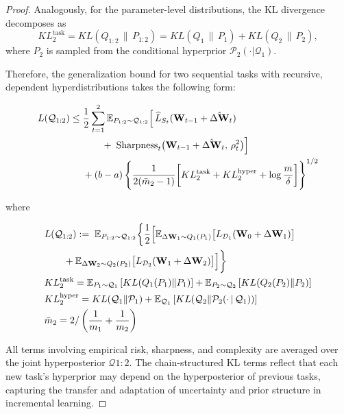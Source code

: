 \documentclass[letterpaper]{article} %
\begin{document}
\begin{proof}
Analogously, for the parameter-level distributions, the KL divergence decomposes as
\begin{equation}
    KL^{\text{task}}_2=KL(Q_{1:2}\,\|\,P_{1:2}) = KL(Q_1\,\|\,P_1) + KL(Q_2\,\|\,P_2),
\end{equation}
where $P_2$ is sampled from the conditional hyperprior $\mathcal{P}_2(\cdot|\mathcal{Q}_1)$.



Therefore, the generalization bound for two sequential tasks with recursive, dependent hyperdistributions takes the following form:

\begin{align}
L(\mathcal{Q}_{1:2}) \leq\; & \frac{1}{2} \sum_{t=1}^2 
    \mathbb{E}_{P_{1:2} \sim \mathcal{Q}_{1:2}} 
    \Big[\, 
        \widehat{L}_{S_t}(\mathbf{W}_{t-1} + \hat{\Delta\mathbf{W}}_t)
    \notag \\
& \qquad 
    +\; \mathrm{Sharpness}_t\big(\mathbf{W}_{t-1} + \hat{\Delta\mathbf{W}}_t,\, \rho_t^2\big)
    \Big] \notag \\
& + (b-a)\, 
    \Bigg\{ \frac{1}{2(\bar{m}_2 - 1)} \bigg[
        KL^{\text{task}}_2 + KL^{\text{hyper}}_2 + \log\frac{m}{\delta}
    \bigg] \Bigg\}^{1/2}
\label{eq:cl-bound-chain-compact}
\end{align}

where 

\begin{align*}
&L(\mathcal{Q}_{1:2}) :=\;  \mathbb{E}_{P_{1:2} \sim \mathcal{Q}_{1:2}}
\bigg\{
    \frac{1}{2} \Big[
        \mathbb{E}_{\Delta\mathbf{W}_1 \sim Q_1(P_1)}\big[
            L_{\mathcal{D}_1}(\mathbf{W}_0 + \Delta\mathbf{W}_1)
        \big] \notag \\
& \qquad
        +
        \mathbb{E}_{\Delta\mathbf{W}_2 \sim Q_2(P_2)}\big[
            L_{\mathcal{D}_2}(\mathbf{W}_1 + \Delta\mathbf{W}_2)
        \big]
    \Big]
\bigg\} \\
&KL^{\text{task}}_2 = 
    \mathbb{E}_{P_1 \sim \mathcal{Q}_1}\left[ KL(Q_1(P_1)\|P_1) \right]
    + \mathbb{E}_{P_2 \sim \mathcal{Q}_2}\left[ KL(Q_2(P_2)\|P_2) \right] \\
&KL^{\text{hyper}}_2 = 
    KL(\mathcal{Q}_1\|\mathcal{P}_1)
    + \mathbb{E}_{\mathcal{Q}_1}\left[ KL(\mathcal{Q}_2 \| \mathcal{P}_2(\cdot\,|\,\mathcal{Q}_1)) \right] \\
&\bar{m}_2 = 2 / \left(\frac{1}{m_1} + \frac{1}{m_2}\right)
\end{align*}


 All terms involving empirical risk, sharpness, and complexity are averaged over the joint hyperposterior $\mathcal{Q}{1:2}$. The chain-structured KL terms reflect that each new task's hyperprior may depend on the hyperposterior of previous tasks, capturing the transfer and adaptation of uncertainty and prior structure in incremental learning.



\end{proof}
\end{document}
